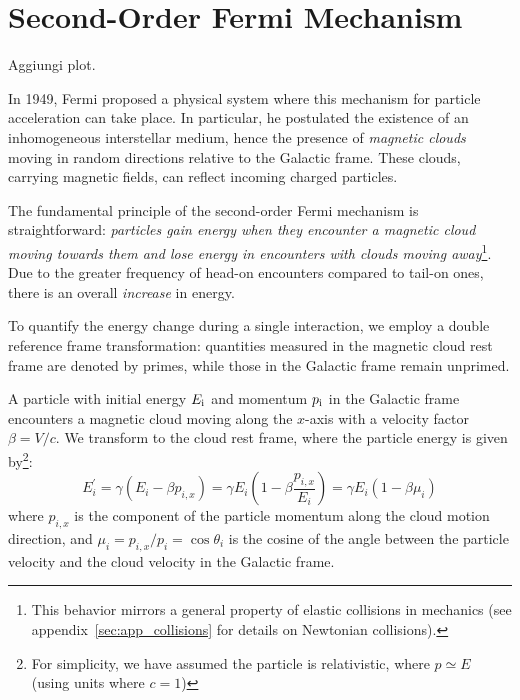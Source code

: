 \section{Second-Order Fermi Mechanism}

{\color{red}Aggiungi plot.}

In 1949, Fermi proposed a physical system where this mechanism for particle acceleration can take place. In particular, he postulated the existence of an inhomogeneous interstellar medium, hence the presence of \emph{magnetic clouds} moving in random directions relative to the Galactic frame. These clouds, carrying magnetic fields, can reflect incoming charged particles.

The fundamental principle of the second-order Fermi mechanism is straightforward: \emph{particles gain energy when they encounter a magnetic cloud moving towards them and lose energy in encounters with clouds moving away}\footnote{This behavior mirrors a general property of elastic collisions in mechanics (see appendix~\ref{sec:app_collisions} for details on Newtonian collisions).}. Due to the greater frequency of head-on encounters compared to tail-on ones, there is an overall \emph{increase} in energy.

To quantify the energy change during a single interaction, we employ a double reference frame transformation: quantities measured in the magnetic cloud rest frame are denoted by primes, while those in the Galactic frame remain unprimed.

A particle with initial energy \( E_{\rm i} \) and momentum \( p_{\rm i} \) in the Galactic frame encounters a magnetic cloud moving along the \( x \)-axis with a velocity factor \( \beta = V / c \). We transform to the cloud rest frame, where the particle energy is given by\footnote{For simplicity, we have assumed the particle is relativistic, where \( p \simeq E \) (using units where \( c = 1 \))}:
\begin{equation}
E_i^\prime = \gamma (E_i - \beta p_{i,x}) = \gamma E_i \left( 1 - \beta \frac{p_{i,x}}{E_i} \right) = \gamma E_i \left( 1 - \beta \mu_i \right)
\end{equation}
where \( p_{i,x} \) is the component of the particle momentum along the cloud motion direction, and \( \mu_i = p_{i,x} / p_i = \cos\theta_i \) is the cosine of the angle between the particle velocity and the cloud velocity in the Galactic frame.


